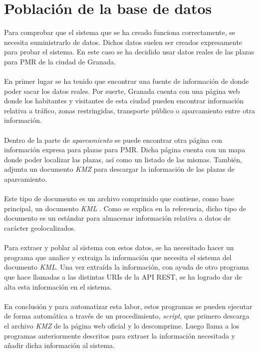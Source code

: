 \chapter{Población de la base de datos}
Para comprobar que el sistema que se ha creado funciona correctamente, se necesita suministrarlo de datos. Dichos datos suelen ser creados expresamente para probar el sistema. En este caso se ha decidido usar datos reales de las plazas para PMR de la ciudad de Granada.
\\\\
En primer lugar se ha tenido que encontrar una fuente de información de donde poder sacar los datos reales. Por suerte, Granada cuenta con una página web \cite{movilidad} donde los habitantes y visitantes de esta ciudad pueden encontrar información relativa a tráfico, zonas restringidas, transporte público o aparcamiento entre otra información.
\\\\
Dentro de la parte de \textit{aparcamiento} se puede encontrar otra página con información expresa para plazas para PMR. Dicha página cuenta con un mapa donde poder localizar las plazas, así como un listado de las mismas. También, adjunta un documento \textit{KMZ} para descargar la información de las plazas de aparcamiento.
\\\\
Este tipo de documento es un archivo comprimido que contiene, como base principal, un documento \textit{KML} \cite{kml}. Como se explica en la referencia, dicho tipo de documento es un estándar para almacenar información relativa a datos de carácter geolocalizados.
\\\\
Para extraer y poblar al sistema con estos datos, se ha necesitado hacer un programa que analice y extraiga la información que necesita el sistema del documento \textit{KML}. Una vez extraída la información, con ayuda de otro programa que hace llamadas a las distintas URIs de la API REST, se ha logrado dar de alta esta información en el sistema.
\\\\
En conclusión y para automatizar esta labor, estos programas se pueden ejecutar de forma automática a través de un procedimiento, \textit{script}, que primero descarga el archivo \textit{KMZ} de la página web oficial y lo descomprime. Luego llama a los programas anteriormente descritos para extraer la información necesitada y añadir dicha información al sistema.
\\\\
